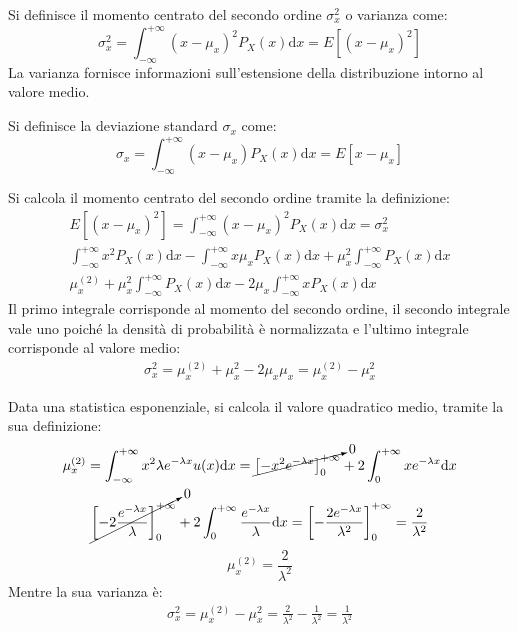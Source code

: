 \documentclass{article}
\newcommand{\df}{\mathrm{d}}
\numberwithin{equation}{subsection}
\begin{document}
Si definisce il momento centrato del secondo ordine $\sigma_x^2$ o varianza come:
\begin{equation}
    \sigma_x^2=\displaystyle\int_{-\infty}^{+\infty}(x-\mu_x)^2P_X(x)\df x=E[(x-\mu_x)^2]
\end{equation}
La varianza fornisce informazioni sull'estensione della distribuzione intorno al valore medio. 


Si definisce la deviazione standard $\sigma_x$ come:
\begin{equation}
    \sigma_x=\displaystyle\int_{-\infty}^{+\infty}(x-\mu_x)P_X(x)\df x=E[x-\mu_x]
\end{equation}


Si calcola il momento centrato del secondo ordine tramite la definizione:
\begin{gather*}
    E\left[(x-\mu_x)^2\right]=\displaystyle\int_{-\infty}^{+\infty}(x-\mu_x)^2P_X(x)\df x=\sigma_x^2\\
    \int_{-\infty}^{+\infty}x^2P_X(x)\df x-\int_{-\infty}^{+\infty}x\mu_xP_X(x)\df x+\mu_x^2\int_{-\infty}^{+\infty}P_X(x)\df x\\
    \mu_x^{(2)}+\mu_x^2\int_{-\infty}^{+\infty}P_X(x)\df x-2\mu_x\int_{-\infty}^{+\infty}xP_X(x)\df x
\end{gather*}
Il primo integrale corrisponde al momento del secondo ordine, il secondo integrale vale uno poiché la densità di probabilità è normalizzata e l'ultimo 
integrale corrisponde al valore medio:
\begin{gather}
    \sigma_x^2=\mu_x^{(2)}+\mu_x^2-2\mu_x\mu_x=\mu_x^{(2)}-\mu_x^2
\end{gather}

Data una statistica esponenziale, si calcola il valore quadratico medio, tramite la sua definizione:
\begin{gather*}
    \mu_x^{(2)}=\displaystyle\int_{-\infty}^{+\infty}x^2\lambda e^{-\lambda x}u(x)\df x=\cancelto{0}{\left[-x^2e^{-\lambda x}\right]_0^{+\infty}}+2\int_{0}^{+\infty}xe^{-\lambda x}\df x\\
    \cancelto{0}{\left[-2\displaystyle\frac{e^{-\lambda x}}{\lambda}\right]_0^{+\infty}}+2\int_{0}^{+\infty}\frac{e^{-\lambda x}}{\lambda}\df x=\left[-\frac{2e^{-\lambda x}}{\lambda^2}\right]^{+\infty}_0=\frac{2}{\lambda^2}
\end{gather*}
\begin{equation}
    \mu_x^{(2)}=\displaystyle\frac{2}{\lambda^2}
\end{equation}
Mentre la sua varianza è:
\begin{gather}
    \sigma_x^2=\mu_x^{(2)}-\mu_x^2=\displaystyle\frac{2}{\lambda^2}-\frac{1}{\lambda^2}=\frac{1}{\lambda^2}
\end{gather}
\end{document}
